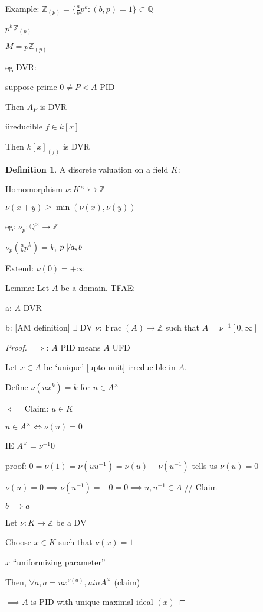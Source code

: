 \documentclass{article}
\theoremstyle{definition}
\newtheorem{definition}{Definition}
\newcommand{\Frac}{\operatorname{Frac}}
\begin{document}
Example: \(\mathbb{Z}_{(p)}=\{ \frac{a}{b}p^k : (b,p) = 1 \} \subset \mathbb{Q} \) 

\(p^k \mathbb{Z}_{(p)}\) 

\(M = p \mathbb{Z}_{(p)}\) 

eg DVR:

suppose prime \(0\neq P \triangleleft A\) PID

Then \(A_P\) is DVR

iireducible \(f\in k[x]\) 

Then \(k[x]_{(f)}\) is DVR

\begin{definition}
    A discrete valuation on a field \(K\):

    Homomorphism \(\nu : K^\times \rightarrowtail \mathbb{Z}\) 

    \(\nu(x+y) \geq \min (\nu(x),\nu(y))\) 
\end{definition}

eg: \(\nu_p : \mathbb{Q}^\times \to \mathbb{Z}\)

\(\nu_p (\frac{a}{b}p^k) = k\), \(p\not\mid a,b\) 

Extend: \(\nu(0)=+\infty\) 

\underline{Lemma}: Let \(A\) be a domain. TFAE:

a: \(A\) DVR

b: [AM definition] \(\exists\) DV \(\nu:\Frac(A) \to \mathbb{Z}\) such that \(A = \nu^{-1} [0,\infty]\)   

\begin{proof}
    \(\implies\): \(A\) PID means \(A\) UFD
    
    Let \(x\in A\) be `unique' [upto unit] irreducible in \(A\).

    Define \(\nu(u x^k)=k\) for \(u\in A^\times\)
    
    \(\impliedby\) Claim: \(u\in K\)
    
    \(u\in A^\times \iff \nu(u)=0\) 

    IE \(A^\times = \nu ^{-1} 0\) 

    proof: \(0 = \nu(1) = \nu (u u ^{-1}) = \nu (u) + \nu(u ^{-1})\) tells us \(\nu(u)=0\)
    
    \(\nu(u) = 0 \implies \nu(u ^{-1})=-0=0 \implies u, u ^{-1} \in A\) // Claim

    \(b \implies a\) 

    Let \(\nu : K \to \mathbb{Z}\) be a DV

    Choose \(x\in K\) such that \(\nu(x) = 1\) 
    
    \(x\) ``uniformizing parameter''

    Then, \(\forall a, a = u x ^{\nu(a)}, u in A^\times\) (claim)

    \(\implies A\) is PID with unique maximal ideal \((x)\) 
    
    
    
    
\end{proof}
\end{document}
